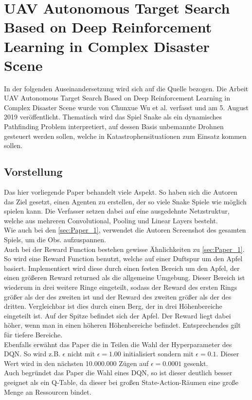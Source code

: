 \section{UAV Autonomous Target Search Based on Deep Reinforcement Learning in Complex Disaster Scene} \label{sec:Paper_3}
In der folgenden Auseinandersetzung wird sich auf die Quelle \cite{UAV} bezogen.
Die Arbeit UAV Autonomous Target Search Based on Deep Reinforcement Learning in Complex Disaster Scene wurde von Chunxue Wu et al. verfasst und am 5. August 2019 veröffentlicht. Thematisch wird das Spiel Snake als ein dynamisches Pathfinding Problem interpretiert, auf dessen Basis unbemannte Drohnen gesteuert werden sollen, welche in Katastrophensituationen zum Einsatz kommen sollen.

\subsection{Vorstellung}
Das hier vorliegende Paper behandelt viele Aspekt. So haben sich die Autoren das Ziel gesetzt, einen Agenten zu erstellen, der so viele Snake Spiele wie möglich spielen kann. Die Verfasser setzen dabei auf eine ausgedehnte Netzstruktur, welche aus mehreren Convolutional, Pooling und Linear Layers besteht.\\
Wie auch bei den \ref{sec:Paper_1}, verwendet die Autoren Screenshot des gesamten Spiels, um die Obs. aufzuspannen.\\
Auch bei der Reward Function bestehen gewisse Ähnlichkeiten zu \ref{sec:Paper_1}. So wird eine Reward Function benutzt, welche auf einer Duftspur um den Apfel basiert. Implementiert wird diese durch einen festen Bereich um den Apfel, der einen größeren Reward returned als die allgemeine Umgebung. Dieser Bereich ist wiederum in drei weitere Ringe eingeteilt, sodass der Reward des ersten Rings größer als der des zweiten ist und der Reward des zweiten größer als der des dritten. Vergleichbar ist dies durch einen Berg, der in drei Höhenbereiche eingeteilt ist. Auf der Spitze befindet sich der Apfel. Der Reward liegt dabei höher, wenn man in einen höheren Höhenbereiche befindet. Entsprechendes gilt für tiefere Bereiche.\\
Ebenfalls erwähnt das Paper die in Teilen die Wahl der Hyperparameter des DQN. So wird z.B. $\epsilon$ nicht mit $\epsilon= 1.00$ initialisiert sondern mit $\epsilon=0.1$. Dieser Wert wird in den nächsten 10.000.000 Zügen auf $\epsilon=0.0001$ gesenkt.\\
Auch begründet das Paper die Wahl eines DQN, so ist dieser deutlich besser geeignet als ein Q-Table, da dieser bei großen State-Action-Räumen eine große Menge an Ressourcen bindet.\\
